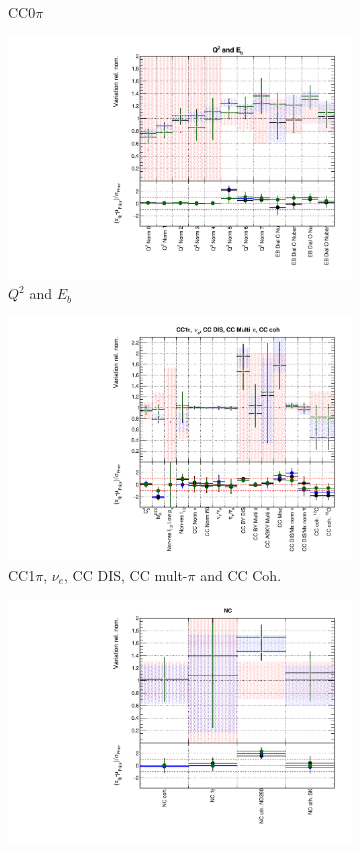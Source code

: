 \begin{figure}
\begin{subfigure}{0.49\textwidth}
  \caption{CC0$\pi$}
\end{subfigure}
\begin{subfigure}{0.49\textwidth}
  \centering
  \includegraphics[width=0.9\linewidth]{figs/fhcrhcfitsxsec_2}
  \caption{$Q^2$ and $E_b$}
\end{subfigure}
\begin{subfigure}{0.49\textwidth}
  \centering
  \includegraphics[width=0.9\linewidth]{figs/fhcrhcfitsxsec_3}
  \caption{CC1$\pi$, $\nu_e$, CC DIS, CC mult-$\pi$ and CC Coh.}
\end{subfigure}
\begin{subfigure}{0.49\textwidth}
  \centering
  \includegraphics[width=0.9\linewidth]{figs/fhcrhcfitsxsec_4}

\end{subfigure}
\end{figure}
